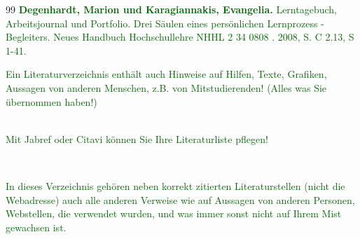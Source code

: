 \documentclass[pdftex,12pt,twoside,footsepline,headsepline,a4paper,final]{scrreprt}
\begin{document}







\def\bibname{Referenzen und Literaturverzeichnis}




\begin{thebibliography}{99}
\textcolor{darkgreen}{\textbf{Degenhardt, Marion und Karagiannakis, Evangelia.} Lerntagebuch, Arbeitsjournal und Portfolio. Drei S\"{a}ulen eines pers\"{o}nlichen Lernprozess - Begleiters. Neues Handbuch Hochschullehre NHHL 2 34 0808 . 2008, S. C 2.13, S 1-41.}
\end{thebibliography}


%


\textcolor{darkgreen}{Ein Literaturverzeichnis enth\"{a}lt auch Hinweise auf Hilfen, Texte, Grafiken, Aussagen von anderen Menschen, z.B. von Mitstudierenden! (Alles was Sie \"{u}bernommen haben!)
}

$_{}$
\\

\textcolor{darkgreen}{Mit Jabref oder Citavi k\"{o}nnen Sie Ihre Literaturliste pflegen!}


$_{}$
\\ \indent

\textcolor{darkgreen}{In dieses Verzeichnis geh\"{o}ren neben korrekt zitierten Literaturstellen (nicht die Webadresse) auch alle anderen Verweise wie auf Aussagen von anderen Personen, Webstellen, die verwendet wurden, und was immer sonst nicht auf Ihrem Mist gewachsen ist.}
\end{document}
